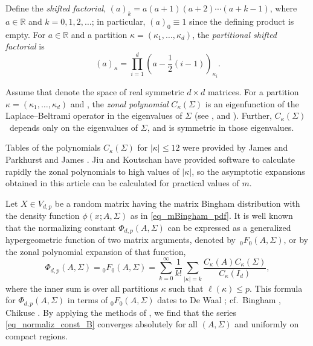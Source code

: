 \documentclass[11pt]{article}
\numberwithin{equation}{section}
\numberwithin{equation}{section}
\def\R {\mathbb{R}}
\newcommand{\sym}{{{\hskip-1pt}\mathop{\mathrm{sym}}}}
\begin{document}
Define the \textit{shifted factorial}, $(a)_k = a(a+1)(a+2) \cdots (a+k-1)$, where $a \in \mathbb{R}$ and ${k=0,1,2,\ldots}$; in particular, $(a)_0 \equiv 1$ since the defining product is empty. For $a \in \mathbb{R}$ and a partition ${\kappa = (\kappa_1,\ldots,\kappa_d)}$, the {\it partitional shifted factorial} is %
\begin{equation}
\label{eq_partit_fact}
(a)_\kappa = \prod_{i=1}^d \left(a-\frac{1}{2}(i-1)\right)_{\kappa_i}.
\end{equation}

Assume that \smash{$\R^{d \times d}_\sym$} denote the space of real symmetric $d \times d$ matrices. For a partition $\kappa = (\kappa_1,\ldots,\kappa_d)$ and \smash{$\Sigma \in \R^{d \times d}_\sym$}, the \textit{zonal polynomial} $C_\kappa(\Sigma)$ is an eigenfunction of the Laplace--Beltrami operator in the eigenvalues of $\Sigma$ (see \cite{James68}, \cite[Chapter 7]{Muirhead} and \cite{Richards10}). Further, $C_\kappa(\Sigma)$~depends only on the eigenvalues of $\Sigma$, and is symmetric in those eigenvalues.

Tables of the polynomials $C_\kappa(\Sigma)$ for $|\kappa| \le 12$ were provided by James \cite[pp.~498--499]{James64} and Parkhurst and James \cite{ParkhurstJames}. Jiu and Koutschan \cite{JiuKoutschan} have provided software to calculate rapidly the zonal polynomials to high values of $|\kappa|$, so the asymptotic expansions obtained in this article can be calculated for practical values of $m$.

Let $X \in V_{d,p}$ be a random matrix having the matrix Bingham distribution with the density function $\phi(x;A,\Sigma)$ as in \eqref{eq_mBingham_pdf}. It is well known that the normalizing constant $\Phi_{d,p}(A,\Sigma)$ can be expressed as a generalized hypergeometric function of two matrix arguments, denoted by~${}_0F_0(A,\Sigma)$, or by the zonal polynomial expansion of that function,
\begin{equation}
\label{eq_normaliz_const_B}
\Phi_{d,p}(A,\Sigma) = {}_0F_0(A,\Sigma) = \sum_{k=0}^\infty \frac{1}{k!} \sum_{|\kappa|=k} \frac{C_\kappa(A) C_\kappa(\Sigma)}{C_\kappa(I_d)},
\end{equation}
where the inner sum is over all partitions $\kappa$ such that $\ell(\kappa) \le p$. This formula for $\Phi_{d,p}(A,\Sigma)$ in terms of ${}_0F_0(A,\Sigma)$ dates to De Waal \cite{DeWaal}; cf.\ Bingham \cite{Bingham}, Chikuse \cite[p.~108]{Chikuse}. By applying the methods of \cite[Theorem~6.3]{GrossRichards}, we find that the series \eqref{eq_normaliz_const_B} converges absolutely for all $(A,\Sigma)$ and uniformly on compact regions.
\end{document}
